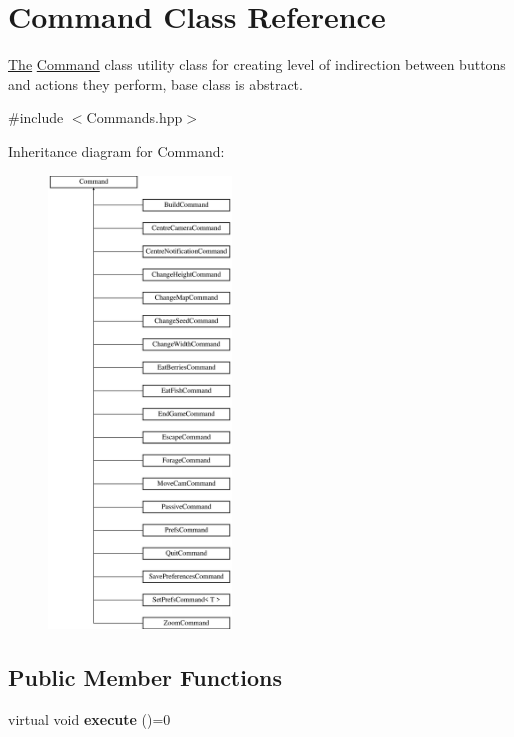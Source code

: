 \hypertarget{class_command}{}\section{Command Class Reference}
\label{class_command}


\hyperlink{namespace_the}{The} \hyperlink{class_command}{Command} class utility class for creating level of indirection between buttons and actions they perform, base class is abstract.  




{\ttfamily \#include $<$Commands.\+hpp$>$}

Inheritance diagram for Command\+:\begin{figure}[H]
\begin{center}
\leavevmode
\includegraphics[height=12.000000cm]{class_command}
\end{center}
\end{figure}
\subsection*{Public Member Functions}
\begin{DoxyCompactItemize}
\item 
\hypertarget{class_command_a6fd7d9bd8df8bfc881e4d6c7cd1878b7}{}virtual void {\bfseries execute} ()=0\label{class_command_a6fd7d9bd8df8bfc881e4d6c7cd1878b7}

\end{DoxyCompactItemize}


